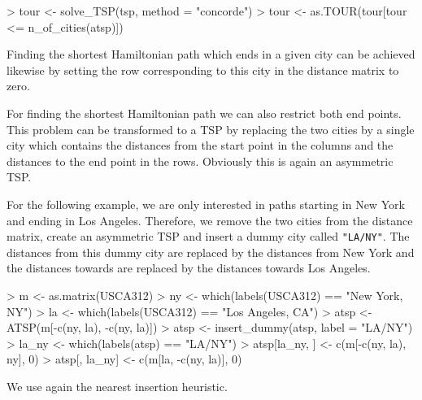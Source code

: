 \documentclass[10pt,a4paper,fleqn]{article}
\newcommand{\code}[1]{\mbox{\texttt{#1}}}
\begin{document}
\begin{Schunk}
\begin{Sinput}
> tour <- solve_TSP(tsp, method = "concorde")
> tour <- as.TOUR(tour[tour <= n_of_cities(atsp)])
\end{Sinput}
\end{Schunk}


Finding the shortest Hamiltonian path which ends in a given city can be achieved
likewise by setting the row corresponding to this city in the distance
matrix to zero.

For finding the shortest Hamiltonian path we can also restrict both end points.
This problem can be transformed to a TSP by replacing the two cities by a
single city which contains the distances from the start point in the columns
and the distances to the end point in the rows. Obviously this is again an
asymmetric TSP.

For the following example, we are only interested in paths starting in New York
and ending in Los Angeles. Therefore, we remove the two cities from the
distance matrix, create an asymmetric TSP and insert a dummy city called
\code{"LA/NY"}. The distances from this dummy city are replaced by the
distances from New York and the distances towards are replaced by the distances
towards Los Angeles.



\begin{Schunk}
\begin{Sinput}
> m <- as.matrix(USCA312)
> ny <- which(labels(USCA312) == "New York, NY")
> la <- which(labels(USCA312) == "Los Angeles, CA")
> atsp <- ATSP(m[-c(ny, la), -c(ny, la)])
> atsp <- insert_dummy(atsp, label = "LA/NY")
> la_ny <- which(labels(atsp) == "LA/NY")
> atsp[la_ny, ] <- c(m[-c(ny, la), ny], 0)
> atsp[, la_ny] <- c(m[la, -c(ny, la)], 0)
\end{Sinput}
\end{Schunk}

We use again the nearest insertion heuristic.
\end{document}
